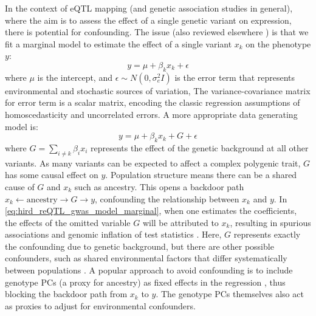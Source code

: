 In the context of \gls{eQTL} mapping (and genetic association studies in general), 
where the aim is to assess the effect of a single genetic variant on expression, 
there is potential for confounding.
The issue (also reviewed elsewhere \autocite{sul2018PopulationStructureGenetic,golan2018MixedModelsCaseControl}) is that we fit a marginal model to estimate the effect of a single variant $x_k$ on the phenotype $y$:
\begin{equation}
    y = \mu + \beta_k x_k + \epsilon
    \label{eq:hird_reQTL_gwas_model_marginal}
\end{equation}
where $\mu$ is the intercept,
and $\epsilon \sim N(0, \sigma_e^2 I)$ is the error term that represents environmental and stochastic sources of variation,
The variance-covariance matrix for error term is a scalar matrix, 
encoding the classic regression assumptions of homoscedasticity and uncorrelated errors.
A more appropriate data generating model is:
\begin{equation}
    y = \mu + \beta_k x_k + G + \epsilon
    \label{eq:hird_reQTL_gwas_model_full}
\end{equation}
where $G = \sum_{i \neq k}{\beta_i x_i}$ represents the effect of the genetic background at all other variants.
As many variants can be expected to affect a complex polygenic trait, $G$ has some causal effect on $y$.
Population structure means there can be a shared cause of $G$ and $x_k$ such as ancestry.
This opens a backdoor path $x_k \leftarrow \text{ancestry} \rightarrow G \rightarrow y$,
confounding the relationship between $x_k$ and $y$.
In \cref{eq:hird_reQTL_gwas_model_marginal},
when one estimates the coefficients,
the effects of the omitted variable $G$ will be attributed to $x_k$,
resulting in spurious associations and genomic inflation of test statistics \autocite{price2010NewApproachesPopulation}.
Here, $G$ represents exactly the confounding due to genetic background,
but there are other possible confounders,
such as shared environmental factors that differ systematically between populations \autocite{vilhjalmsson2013NatureConfoundingGenomewide}.
A popular approach to avoid confounding is to include genotype \glspl{PC} (a proxy for ancestry) as fixed effects in the regression \autocite{price2006PrincipalComponentsAnalysis,eu-ahsunthornwattana2014ComparisonMethodsAccount},
thus blocking the backdoor path from $x_k$ to $y$.
The genotype \glspl{PC} themselves also act as proxies to adjust for environmental confounders.

